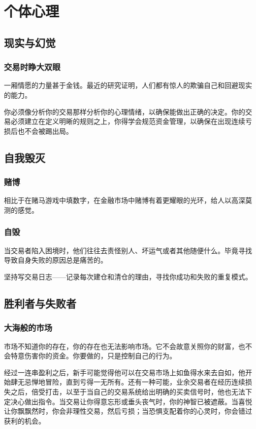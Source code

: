 \chapter{个体心理}
\section{现实与幻觉}
\subsection*{交易时睁大双眼}
一厢情愿的力量甚于金钱。最近的研究证明，人们都有惊人的欺骗自己和回避现实的能力。
\begin{tcolorbox}
    你必须像分析你的交易那样分析你的心理情绪，以确保能做出正确的决定。你的交易必须建立在定义明晰的规则之上，你得学会规范资金管理，以确保在出现连续亏损后也不会被踢出局。
\end{tcolorbox}
\section{自我毁灭}
\subsection*{赌博}
相比于在赌马游戏中填数字，在金融市场中赌博有着更耀眼的光环，给人以高深莫测的感觉。
\subsection*{自毁}
当交易者陷入困境时，他们往往去责怪别人、坏运气或者其他随便什么。毕竟寻找导致自身失败的原因总是痛苦的。
\begin{tcolorbox}
    坚持写交易日志——记录每次建仓和清仓的理由，寻找你成功和失败的重复模式。
\end{tcolorbox}
\section{胜利者与失败者}
\subsection*{大海般的市场}
市场不知道你的存在，你的存在也无法影响市场。它不会故意关照你的财富，也不会特意伤害你的资金。你要做的，只是控制自己的行为。

经过一连串盈利之后，新手可能觉得他可以在交易市场上如鱼得水来去自如，他开始肆无忌惮地冒险，直到亏得一无所有。还有一种可能，业余交易者在经历连续损失之后，倍受打击，以至于当自己的交易系统给出明确的买卖信号时，他也无法下定决心做出指令。当交易让你得意忘形或垂头丧气时，你的神智已被遮蔽。当喜悦让你飘飘然时，你会非理性交易，然后亏损；当恐惧支配着你的心灵时，你会错过获利的机会。


